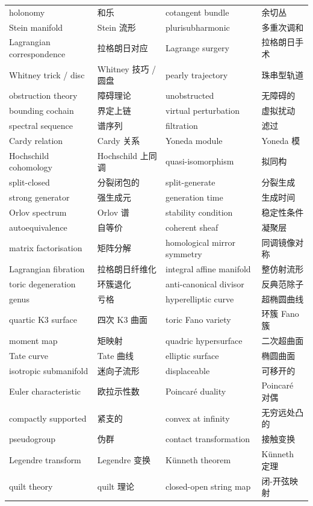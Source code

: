 \documentclass[11pt,a4paper]{article}
\numberwithin{equation}{section}
\begin{document}
\begin{center}
\begin{longtable}{p{}p{}p{}p{}}
holonomy & 和乐 & cotangent bundle & 余切丛 \\
Stein manifold & Stein 流形 & plurisubharmonic & 多重次调和 \\
Lagrangian correspondence & 拉格朗日对应 & Lagrange surgery & 拉格朗日手术 \\
Whitney trick / disc & Whitney 技巧 / 圆盘 & pearly trajectory & 珠串型轨道 \\
obstruction theory & 障碍理论 & unobstructed & 无障碍的 \\
bounding cochain & 界定上链 & virtual perturbation & 虚拟扰动 \\
spectral sequence & 谱序列 & filtration & 滤过 \\
Cardy relation & Cardy 关系 & Yoneda module & Yoneda 模 \\
Hochschild cohomology & Hochschild 上同调 & quasi-isomorphism & 拟同构 \\
split-closed & 分裂闭包的 & split-generate & 分裂生成 \\
strong generator & 强生成元 & generation time & 生成时间 \\
Orlov spectrum & Orlov 谱 & stability condition & 稳定性条件 \\
autoequivalence & 自等价 & coherent sheaf & 凝聚层 \\
matrix factorisation & 矩阵分解 & homological mirror symmetry & 同调镜像对称 \\
Lagrangian fibration & 拉格朗日纤维化 & integral affine manifold & 整仿射流形 \\
toric degeneration & 环簇退化 & anti-canonical divisor & 反典范除子 \\
genus & 亏格 & hyperelliptic curve & 超椭圆曲线 \\
quartic K3 surface & 四次 K3 曲面 & toric Fano variety & 环簇 Fano 簇 \\
moment map & 矩映射 & quadric hypersurface & 二次超曲面 \\
Tate curve & Tate 曲线 & elliptic surface & 椭圆曲面 \\
isotropic submanifold & 迷向子流形 & displaceable & 可移开的 \\
Euler characteristic & 欧拉示性数 & Poincar\'e duality & Poincar\'e 对偶 \\
compactly supported & 紧支的 & convex at infinity & 无穷远处凸的 \\
pseudogroup & 伪群 & contact transformation & 接触变换 \\
Legendre transform & Legendre 变换 & K\"unneth theorem & K\"unneth 定理 \\
quilt theory & quilt 理论 & closed-open string map & 闭-开弦映射 \\
\end{longtable}
\end{center}
\end{document}
